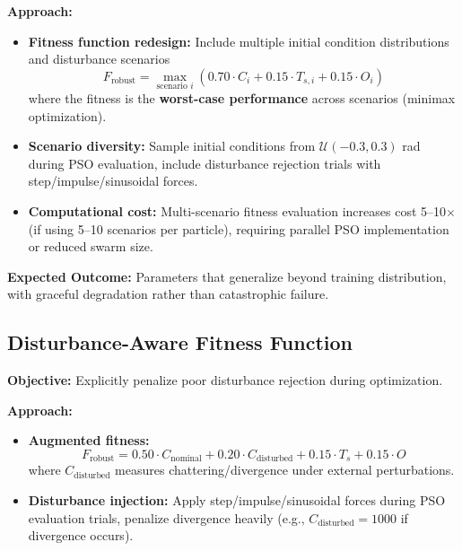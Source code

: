 \textbf{Approach:}
\begin{itemize}
    \item \textbf{Fitness function redesign:} Include multiple initial condition distributions and disturbance scenarios
    \begin{equation}
    \label{eq:robust_minimax_fitness}
    F_{\text{robust}} = \max_{\text{scenario } i} \left( 0.70 \cdot C_i + 0.15 \cdot T_{s,i} + 0.15 \cdot O_i \right)
    \end{equation}
    where the fitness is the \textbf{worst-case performance} across scenarios (minimax optimization).

    \item \textbf{Scenario diversity:} Sample initial conditions from $\mathcal{U}(-0.3, 0.3)$ rad during PSO evaluation, include disturbance rejection trials with step/impulse/sinusoidal forces.

    \item \textbf{Computational cost:} Multi-scenario fitness evaluation increases cost 5--10$\times$ (if using 5--10 scenarios per particle), requiring parallel PSO implementation or reduced swarm size.
\end{itemize}

\textbf{Expected Outcome:} Parameters that generalize beyond training distribution, with graceful degradation rather than catastrophic failure.

\subsection{Disturbance-Aware Fitness Function}
\label{subsec:disturbance_fitness}

\textbf{Objective:} Explicitly penalize poor disturbance rejection during optimization.

\textbf{Approach:}
\begin{itemize}
    \item \textbf{Augmented fitness:}
    \begin{equation}
    \label{eq:disturbance_fitness}
    F_{\text{robust}} = 0.50 \cdot C_{\text{nominal}} + 0.20 \cdot C_{\text{disturbed}} + 0.15 \cdot T_s + 0.15 \cdot O
    \end{equation}
    where $C_{\text{disturbed}}$ measures chattering/divergence under external perturbations.

    \item \textbf{Disturbance injection:} Apply step/impulse/sinusoidal forces during PSO evaluation trials, penalize divergence heavily (e.g., $C_{\text{disturbed}} = 1000$ if divergence occurs).
\end{itemize}

